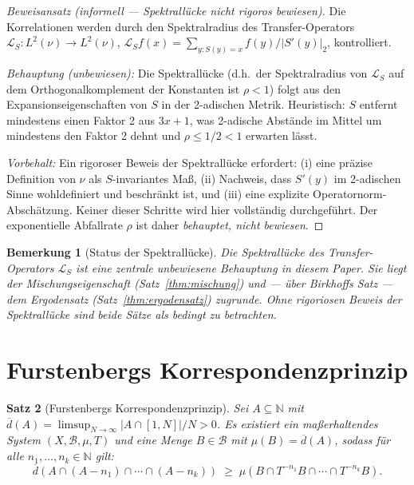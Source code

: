 \documentclass[12pt,a4paper]{article}
\newtheorem{theorem}{Satz}[section]
\newtheorem{remark}[theorem]{Bemerkung}
\begin{document}
\begin{proof}[Beweisansatz (informell — Spektrallücke nicht rigoros bewiesen)]
Die Korrelationen werden durch den Spektralradius des Transfer-Operators
$\mathcal{L}_S\colon L^2(\nu) \to L^2(\nu)$, $\mathcal{L}_S f(x) = \sum_{y: S(y)=x} f(y)/|S'(y)|_2$,
kontrolliert.

\emph{Behauptung (unbewiesen):} Die Spektrallücke (d.h.\ der Spektralradius von
$\mathcal{L}_S$ auf dem Orthogonalkomplement der Konstanten ist $\rho < 1$) folgt
aus den Expansionseigenschaften von $S$ in der 2-adischen Metrik. Heuristisch:
$S$ entfernt mindestens einen Faktor 2 aus $3x+1$, was 2-adische Abstände im
Mittel um mindestens den Faktor 2 dehnt und $\rho \leq 1/2 < 1$ erwarten lässt.

\emph{Vorbehalt:} Ein rigoroser Beweis der Spektrallücke erfordert: (i) eine präzise
Definition von $\nu$ als $S$-invariantes Maß, (ii) Nachweis, dass $S'(y)$ im
2-adischen Sinne wohldefiniert und beschränkt ist, und (iii) eine explizite
Operatornorm-Abschätzung. Keiner dieser Schritte wird hier vollständig durchgeführt.
Der exponentielle Abfallrate $\rho$ ist daher \emph{behauptet, nicht bewiesen}.
\end{proof}

\begin{remark}[Status der Spektrallücke]\label{rem:spektrallücke}
Die Spektrallücke des Transfer-Operators $\mathcal{L}_S$ ist eine zentrale unbewiesene
Behauptung in diesem Paper. Sie liegt der Mischungseigenschaft (Satz~\ref{thm:mischung})
und — über Birkhoffs Satz — dem Ergodensatz (Satz~\ref{thm:ergodensatz}) zugrunde.
Ohne rigoriosen Beweis der Spektrallücke sind beide Sätze als bedingt zu betrachten.
\end{remark}

\section{Furstenbergs Korrespondenzprinzip}

\begin{theorem}[Furstenbergs Korrespondenzprinzip]\label{thm:furstenberg}
Sei $A \subseteq \mathbb{N}$ mit $\overline{d}(A) = \limsup_{N\to\infty} |A \cap [1,N]|/N > 0$.
Es existiert ein maßerhaltendes System $(X, \mathcal{B}, \mu, T)$ und eine Menge
$B \in \mathcal{B}$ mit $\mu(B) = \overline{d}(A)$, sodass für alle
$n_1, \ldots, n_k \in \mathbb{N}$ gilt:
\[
  \overline{d}(A \cap (A - n_1) \cap \cdots \cap (A - n_k)) \;\geq\;
  \mu(B \cap T^{-n_1}B \cap \cdots \cap T^{-n_k}B).
\]
\end{theorem}
\end{document}
